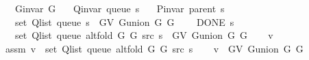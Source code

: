 \begin{isabellebody}
\ \ \ {\isachardoublequoteopen}G{\isachardot}{\kern0pt}invar\ G{}{\isachardoublequoteclose}\isanewline
\ \ \ {\isachardoublequoteopen}Q{\isacharunderscore}{\kern0pt}invar\ {\isacharparenleft}{\kern0pt}queue\ s{\isacharparenright}{\kern0pt}{\isachardoublequoteclose}\isanewline
\ \ \ {\isachardoublequoteopen}P{\isacharunderscore}{\kern0pt}invar\ {\isacharparenleft}{\kern0pt}parent\ s{\isacharparenright}{\kern0pt}{\isachardoublequoteclose}\isanewline
\ \ \ {\isachardoublequoteopen}set\ {\isacharparenleft}{\kern0pt}Q{\isacharunderscore}{\kern0pt}list\ {\isacharparenleft}{\kern0pt}queue\ s{\isacharparenright}{\kern0pt}{\isacharparenright}{\kern0pt}\ {\isasymsubseteq}\ G{\isachardot}{\kern0pt}V\ {\isacharparenleft}{\kern0pt}G{\isachardot}{\kern0pt}union\ G{}\ G{}{\isacharparenright}{\kern0pt}{\isachardoublequoteclose}\isanewline
\ \ \ {\isachardoublequoteopen}{\isasymnot}\ DONE\ s{\isachardoublequoteclose}\isanewline
\ \ \ {\isachardoublequoteopen}set\ {\isacharparenleft}{\kern0pt}Q{\isacharunderscore}{\kern0pt}list\ {\isacharparenleft}{\kern0pt}queue\ {\isacharparenleft}{\kern0pt}alt{\isacharunderscore}{\kern0pt}fold\ G{}\ G{}\ src\ s{\isacharparenright}{\kern0pt}{\isacharparenright}{\kern0pt}{\isacharparenright}{\kern0pt}\ {\isasymsubseteq}\ G{\isachardot}{\kern0pt}V\ {\isacharparenleft}{\kern0pt}G{\isachardot}{\kern0pt}union\ G{}\ G{}{\isacharparenright}{\kern0pt}{\isachardoublequoteclose}%
\endisataginvisible
{\isafoldinvisible}%
%
\isadeliminvisible
\isanewline
%
\endisadeliminvisible
%
\isadelimproof
%
\endisadelimproof
%
\isatagproof
{}\isamarkupfalse%
\isanewline
\ \ \isamarkupfalse%
\ v\isanewline
\ \ \isamarkupfalse%
\ assm{\isacharcolon}{\kern0pt}\ {\isachardoublequoteopen}v\ {\isasymin}\ set\ {\isacharparenleft}{\kern0pt}Q{\isacharunderscore}{\kern0pt}list\ {\isacharparenleft}{\kern0pt}queue\ {\isacharparenleft}{\kern0pt}alt{\isacharunderscore}{\kern0pt}fold\ G{}\ G{}\ src\ s{\isacharparenright}{\kern0pt}{\isacharparenright}{\kern0pt}{\isacharparenright}{\kern0pt}{\isachardoublequoteclose}\isanewline
\ \ \isamarkupfalse%
\ {\isachardoublequoteopen}v\ {\isasymin}\ G{\isachardot}{\kern0pt}V\ {\isacharparenleft}{\kern0pt}G{\isachardot}{\kern0pt}union\ G{}\ G{}{\isacharparenright}{\kern0pt}{\isachardoublequoteclose}\isanewline
\ \ \isamarkupfalse%

\end{isabellebody}
